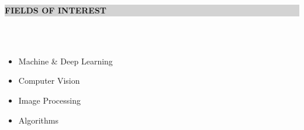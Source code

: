 \documentclass[a4paper,10pt]{article}
\newcommand{\hsep}{-0.6cm}
\newcommand{\resheading}[1]{{\small \colorbox{lightgray}{\begin{minipage}{1\textwidth}{\textbf{#1 \vphantom{p\^{E}}}}\end{minipage}}}}
\begin{document}
\hspace{-0.5cm}
\resheading{\textbf{\large FIELDS OF INTEREST}}\\[\hsep]
\\[0.2cm]
\noindent
    \begin{minipage}{.28\textwidth}
        \begin{itemize}
    		\item Machine \& Deep Learning\\[\hsep]
    	\end{itemize}
    \end{minipage} 
    \noindent
    \begin{minipage}{.2\textwidth}
        \begin{itemize}
    		\item Computer Vision\\[\hsep]
    	\end{itemize}
    \end{minipage} 
     \noindent
    \begin{minipage}{.2\textwidth}
        \begin{itemize}
    		\item Image Processing\\[\hsep]
    	\end{itemize}
    \end{minipage}
     \noindent
    \begin{minipage}{.2\textwidth}
        \begin{itemize}
    		\item Algorithms\\[\hsep]
    	\end{itemize}
    \end{minipage}
    
\vspace{0.3cm}
\end{document}
